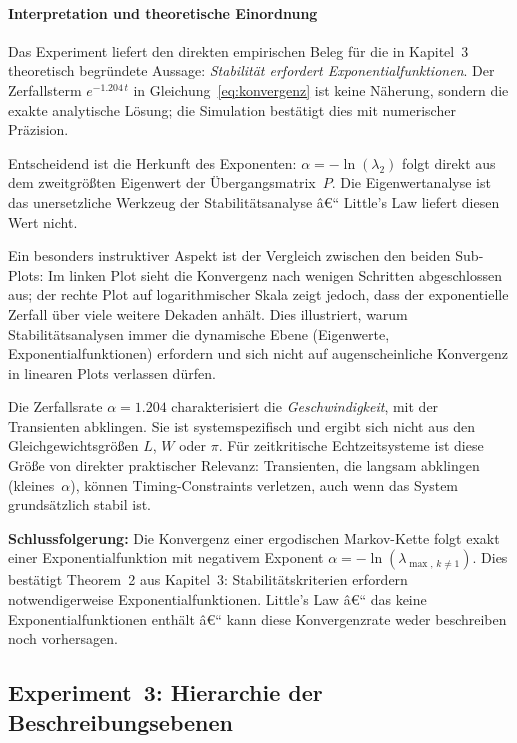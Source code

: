 ﻿\documentclass[a4paper,12pt]{report}
\theoremstyle{definition}
\begin{document}
\paragraph{Interpretation und theoretische Einordnung}

Das Experiment liefert den direkten empirischen Beleg für die in
Kapitel~3 theoretisch begründete Aussage: \emph{Stabilität erfordert
	Exponentialfunktionen}.  Der Zerfallsterm $e^{-1.204\,t}$ in
Gleichung~\eqref{eq:konvergenz} ist keine Näherung, sondern die exakte
analytische Lösung; die Simulation bestätigt dies mit numerischer
Präzision.

Entscheidend ist die Herkunft des Exponenten: $\alpha = -\ln(\lambda_2)$
folgt direkt aus dem zweitgrößten Eigenwert der Übergangsmatrix~$P$.
Die Eigenwertanalyse ist das unersetzliche Werkzeug der
Stabilitätsanalyse â€“ Little's Law liefert diesen Wert nicht.

Ein besonders instruktiver Aspekt ist der Vergleich zwischen den
beiden Sub-Plots: Im linken Plot sieht die Konvergenz nach wenigen
Schritten abgeschlossen aus; der rechte Plot auf logarithmischer
Skala zeigt jedoch, dass der exponentielle Zerfall über viele weitere
Dekaden anhält.  Dies illustriert, warum Stabilitätsanalysen immer
die dynamische Ebene (Eigenwerte, Exponentialfunktionen) erfordern
und sich nicht auf augenscheinliche Konvergenz in linearen Plots
verlassen dürfen.

Die Zerfallsrate $\alpha = 1.204$ charakterisiert die
\emph{Geschwindigkeit}, mit der Transienten abklingen.  Sie ist
systemspezifisch und ergibt sich nicht aus den Gleichgewichtsgrößen
$L$, $W$ oder $\pi$.  Für zeitkritische Echtzeitsysteme ist diese
Größe von direkter praktischer Relevanz: Transienten, die langsam
abklingen (kleines~$\alpha$), können Timing-Constraints verletzen,
auch wenn das System grundsätzlich stabil ist.

\textbf{Schlussfolgerung:} Die Konvergenz einer ergodischen
Markov-Kette folgt exakt einer Exponentialfunktion mit negativem
Exponent $\alpha = -\ln(\lambda_{\max,\,k \neq 1})$.  Dies bestätigt
Theorem~2 aus Kapitel~3: Stabilitätskriterien erfordern notwendigerweise
Exponentialfunktionen.  Little's Law â€“ das keine Exponentialfunktionen
enthält â€“ kann diese Konvergenzrate weder beschreiben noch vorhersagen.

\subsection{Experiment~3: Hierarchie der Beschreibungsebenen}
\label{subsubsec:exp3}
\end{document}
